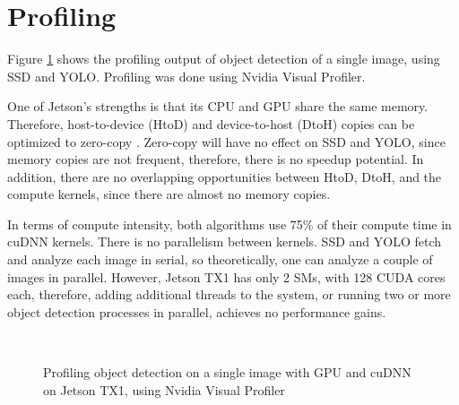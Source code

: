 \section{Profiling}
\label{sec:profiling}

Figure \ref{fig:profile} shows the profiling output of object detection of a single image, using SSD and YOLO. Profiling was done using Nvidia Visual Profiler.

One of Jetson's strengths is that its CPU and GPU share the same memory. Therefore, host-to-device (HtoD) and device-to-host (DtoH) copies can be optimized to zero-copy \cite{tegrazerocopy}. Zero-copy will have no effect on SSD and YOLO, since memory copies are not frequent, therefore, there is no speedup potential. In addition, there are no overlapping opportunities between HtoD, DtoH, and the compute kernels, since there are almost no memory copies.

In terms of compute intensity, both algorithms use 75\% of their compute time in cuDNN kernels. There is no parallelism between kernels. SSD and YOLO fetch and analyze each image in serial, so theoretically, one can analyze a couple of images in parallel. However, Jetson TX1 has only 2 SMs, with 128 CUDA cores each, therefore, adding additional threads to the system, or running two or more object detection processes in parallel, achieves no performance gains.

\begin{figure}[t]
	\begin{center}
	 \\

	\caption{Profiling object detection on a single image with GPU and cuDNN on Jetson TX1, using Nvidia Visual Profiler}
	\label{fig:profile}
	\end{center}
\end{figure}


